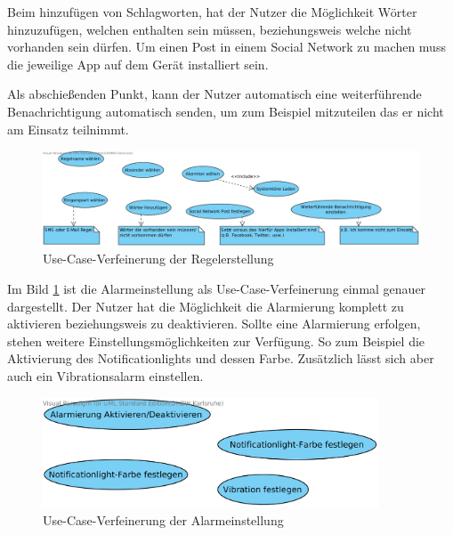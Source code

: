 Beim hinzuf\"ugen von Schlagworten, hat der Nutzer die M\"oglichkeit W\"orter hinzuzuf\"ugen, welchen enthalten sein m\"ussen, beziehungsweis welche nicht vorhanden sein d\"urfen. Um einen Post in einem Social Network zu machen muss die jeweilige App auf dem Ger\"at installiert sein.

Als abschie\ss{}enden Punkt, kann der Nutzer automatisch eine weiterf\"uhrende Benachrichtigung automatisch senden, um zum Beispiel mitzuteilen das er nicht am Einsatz teilnimmt.
\begin{figure}[!ht]
\centering
\includegraphics[width=16cm]{Bilder/UseCaseRegelerstellung.png}
\caption{Use-Case-Verfeinerung der Regelerstellung}
\label{Regelerstellung Use Case}
\centering
\end{figure}

\FloatBarrier
Im Bild \ref{Regelerstellung Use Case} ist die Alarmeinstellung als Use-Case-Verfeinerung einmal genauer dargestellt. Der Nutzer hat die M\"oglichkeit die Alarmierung komplett zu aktivieren beziehungsweis zu deaktivieren. Sollte eine Alarmierung erfolgen, stehen weitere Einstellungsm\"oglichkeiten zur Verf\"ugung. So zum Beispiel die Aktivierung des Notificationlights und dessen Farbe. Zus\"atzlich l\"asst sich aber auch ein Vibrationsalarm einstellen.
\begin{figure}[!ht]
\centering
\includegraphics[width=10cm]{Bilder/UseCaseAlarmeinstellung.png}
\caption{Use-Case-Verfeinerung der Alarmeinstellung}
\label{Alarmeinstellung Use Case}
\centering
\end{figure}

